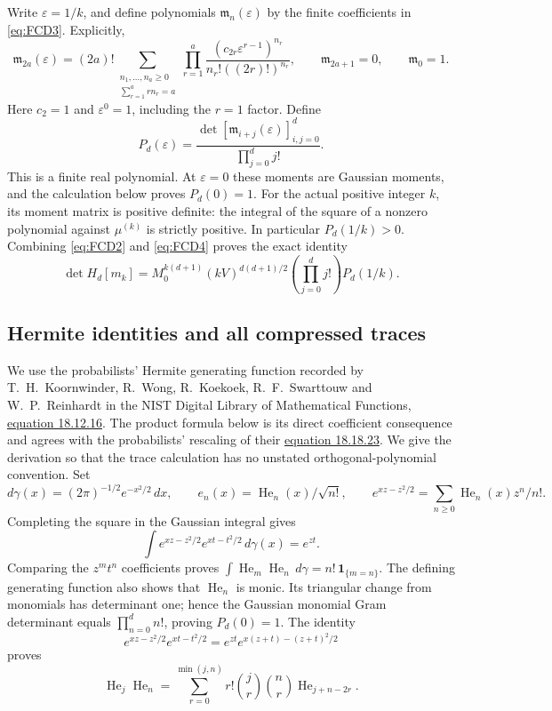 Write \(\varepsilon=1/k\), and define polynomials \(\mathfrak m_n(\varepsilon)\)
by the finite coefficients in \eqref{eq:FCD3}. Explicitly,
\[
 \mathfrak m_{2a}(\varepsilon)
 =(2a)!\!
 \sum_{\substack{n_1,\ldots,n_a\ge0\\
                         \sum_{r=1}^a r n_r=a}}
 \prod_{r=1}^a
  \frac{(c_{2r}\varepsilon^{r-1})^{n_r}}
       {n_r!((2r)!)^{n_r}},
 \qquad \mathfrak m_{2a+1}=0,\qquad \mathfrak m_0=1.
\]
Here \(c_2=1\) and \(\varepsilon^0=1\), including the \(r=1\) factor.
Define
\begin{equation}
 P_d(\varepsilon)=
 \frac{\det[\mathfrak m_{i+j}(\varepsilon)]_{i,j=0}^{d}}
      {\prod_{j=0}^d j!}.
 \tag{FCD4}\label{eq:FCD4}
\end{equation}
This is a finite real polynomial. At \(\varepsilon=0\) these moments are
Gaussian moments, and the calculation below proves \(P_d(0)=1\).
For the actual positive integer \(k\), its moment matrix is positive
definite: the integral of the square of a nonzero polynomial against
\(\mu^{(k)}\) is strictly positive. In particular \(P_d(1/k)>0\).
Combining \eqref{eq:FCD2} and \eqref{eq:FCD4} proves the exact identity
\begin{equation}
 \boxed{\displaystyle
 \det H_d[m_k]=M_0^{k(d+1)}(kV)^{d(d+1)/2}
                    \left(\prod_{j=0}^d j!\right)P_d(1/k).}
 \tag{FCD5}\label{eq:FCD5}
\end{equation}

\subsection{Hermite identities and all compressed traces}

We use the probabilists' Hermite generating function recorded by
T.~H.~Koornwinder, R.~Wong, R.~Koekoek, R.~F.~Swarttouw and
W.~P.~Reinhardt in the NIST Digital Library of Mathematical Functions,
\href{https://dlmf.nist.gov/18.12.E16}{equation 18.12.16}.
The product formula below is its direct coefficient consequence and agrees
with the probabilists' rescaling of their
\href{https://dlmf.nist.gov/18.18.E23}{equation 18.18.23}.
We give the derivation so that the trace calculation has no unstated
orthogonal-polynomial convention.
Set
\[
 d\gamma(x)=(2\pi)^{-1/2}e^{-x^2/2}\,dx,\qquad
 e_n(x)=\operatorname{He}_n(x)/\sqrt{n!},\qquad
 e^{xz-z^2/2}=\sum_{n\ge0}\operatorname{He}_n(x)z^n/n!.
\]
Completing the square in the Gaussian integral gives
\[
 \int e^{xz-z^2/2}e^{xt-t^2/2}\,d\gamma(x)=e^{zt}.
\]
Comparing the \(z^mt^n\) coefficients proves
\(\int \operatorname{He}_m\operatorname{He}_n\,d\gamma
   =n!\,\mathbf1_{\{m=n\}}\).
The defining generating function also shows that
\(\operatorname{He}_n\) is monic. Its triangular change from monomials has
determinant one; hence the Gaussian monomial Gram determinant equals
\(\prod_{n=0}^d n!\), proving \(P_d(0)=1\).
The identity
\[
 e^{xz-z^2/2}e^{xt-t^2/2}
    =e^{zt}e^{x(z+t)-(z+t)^2/2}
\]
proves
\begin{equation}
 \operatorname{He}_j\operatorname{He}_n
   =\sum_{r=0}^{\min(j,n)}
       r!\binom jr\binom nr\operatorname{He}_{j+n-2r}.
 \tag{FCD6}\label{eq:FCD6}
\end{equation}

